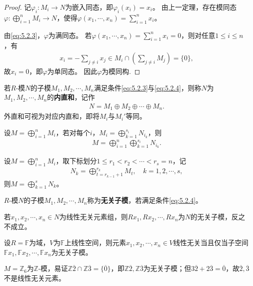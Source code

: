 \documentclass[../../main.tex]{subfiles}%
\begin{document}
\begin{proof}

记$\varphi_i\colon M_i\to N$为嵌入同态，即$\varphi_i(x_i)=x_i$。
由上一定理，存在模同态$\varphi\colon \bigoplus\limits_{i=1}^n M_i\to N$，使得$\varphi(x_1,\cdots,x_n)=\sum\limits_{i=1}^n x_i$。

由\eqref{eq:5.2.3}，$\varphi$为满同态。
若$\varphi(x_1,\cdots,x_n)=\sum\limits_{i=1}^n x_i=0$，则对任意$1\leqslant i\leqslant n$，有
\begin{align*}
x_i=-\sum\limits_{j\neq i}x_j\in M_i\cap\left(\sum\limits_{j\neq i}M_j\right)=\{0\},
\end{align*}
故$x_i=0$，即$\varphi$为单同态。
因此$\varphi$为模同构.

\end{proof}

\begin{definition}
若$R$-模$N$的子模$M_1,M_2,\cdots,M_n$满足条件\eqref{eq:5.2.3}与\eqref{eq:5.2.4}，则称$N$为$M_1,M_2,\cdots,M_n$的\textbf{内直和}，记作
\begin{align*}
N=M_1\oplus M_2\oplus\cdots\oplus M_n.
\end{align*}
外直和可视为对应内直和，即将$M_i$与$M_i'$等同。
\end{definition}

\begin{proposition}
设$M=\bigoplus\limits_{i=1}^n M_i$，若对每个$i$，$M_i=\bigoplus\limits_{k=1}^{s_i} N_{i_k}$，则
\begin{align*}
M=\bigoplus\limits_{i=1}^n\bigoplus\limits_{k=1}^{s_i} N_{i_k}.
\end{align*}
\end{proposition}

\begin{proposition}
设$M=\bigoplus\limits_{i=1}^n M_i$，取下标划分$1\leqslant r_1<r_2<\cdots<r_s=n$，记
\begin{align*}
N_k=\bigoplus\limits_{t=r_{k-1}+1}^{r_k} M_t,\quad k=1,2,\cdots,s,
\end{align*}
则$M=\bigoplus\limits_{k=1}^s N_k$。
\end{proposition}

\begin{definition}
$R$-模$N$的子模$M_1,M_2,\cdots,M_n$称为\textbf{无关子模}，若满足条件\eqref{eq:5.2.4}。
\end{definition}

\begin{remark}
若$x_1,x_2,\cdots,x_n\in N$为线性无关元素组，则$Rx_1,Rx_2,\cdots,Rx_n$为$N$的无关子模，反之不成立。
\end{remark}

\begin{example}
设$R=\mathbb{F}$为域，$V$为$\mathbb{F}$上线性空间，则元素$x_1,x_2,\cdots,x_n\in V$线性无关当且仅当子空间$\mathbb{F}x_1,\mathbb{F}x_2,\cdots,\mathbb{F}x_n$为无关子模。
\end{example}

\begin{example}
$M=\mathbb{Z}_6$为$\mathbb{Z}$-模，易证$\mathbb{Z}\overline{2}\cap\mathbb{Z}\overline{3}=\{\overline{0}\}$，即$\mathbb{Z}\overline{2},\mathbb{Z}\overline{3}$为无关子模；但$3\overline{2}+2\overline{3}=\overline{0}$，故$\overline{2},\overline{3}$不是线性无关元素。
\end{example}
\end{document}
